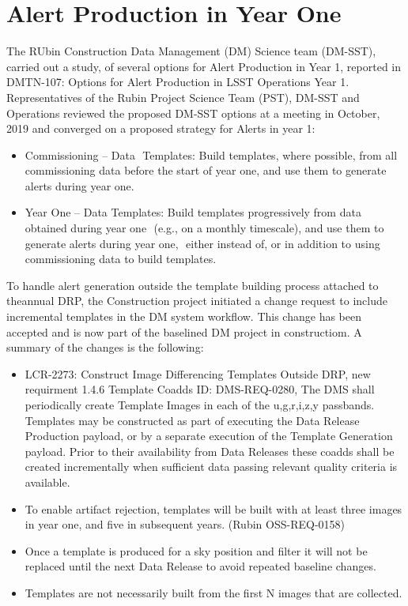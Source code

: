\section{Alert Production in Year One}
The RUbin Construction Data Management (DM) Science team (DM-SST), carried out a study, of several options for Alert Production in Year 1, reported in DMTN-107: Options for Alert Production in LSST Operations Year 1.  
Representatives of the Rubin Project Science Team (PST), DM-SST and Operations reviewed the proposed DM-SST options at a meeting in October, 2019 and converged on a proposed strategy for Alerts in year 1:

\begin{itemize}
\item Commissioning – Data  Templates: Build templates, where possible, from all commissioning data before the start of year one, and use them to generate alerts during year one. 
\item Year One – Data Templates: Build templates progressively from data obtained during year one  (e.g., on a monthly timescale), and use them to generate alerts during year one,  either instead of, or in addition to using commissioning data to build templates.
\end{itemize}

To handle alert generation outside the template building process attached to theannual DRP, the Construction project initiated a change request to include incremental templates in the DM system workflow. This change has been accepted and is now part of the baselined DM project in constructiom. A summary of the changes is the following:

\begin{itemize} 
\item LCR-2273: Construct Image Differencing Templates Outside DRP, new requirment 1.4.6 Template Coadds ID: DMS-REQ-0280, The DMS shall periodically create Template Images in each of the u,g,r,i,z,y passbands. Templates may be constructed as part of executing the Data Release Production payload, or by a separate execution of the Template Generation payload. Prior to their availability from Data Releases these coadds shall be created incrementally when sufficient data passing relevant quality criteria is available. 
\item To enable artifact rejection, templates will be built with at least three images in year one, and five in subsequent years.  (Rubin OSS-REQ-0158)
\item Once a template is produced for a sky position and filter it will not be replaced until the next Data Release to avoid repeated baseline changes.
\item Templates are not necessarily built from the first N images that are collected.
\end{itemize}

